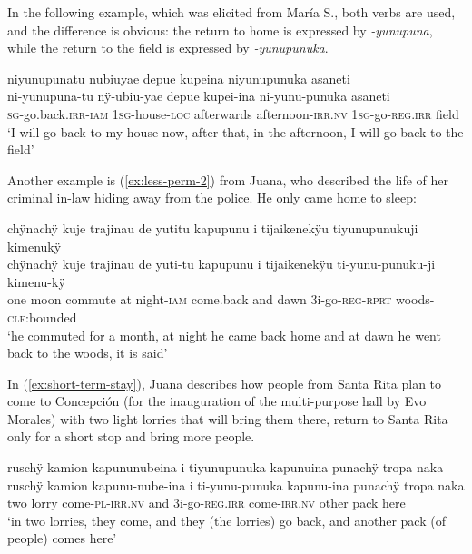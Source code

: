 In the following example, which was elicited from María S., both verbs are used, and the difference is obvious: the return to home is expressed by \textit{-yunupuna}, while the return to the field is expressed by \textit{-yunupunuka}.

\ea\label{ex:less-perm-1}
\begingl
\glpreamble niyunupunatu nubiuyae depue kupeina niyunupunuka asaneti\\
\gla ni-yunupuna-tu nÿ-ubiu-yae depue kupei-ina ni-yunu-punuka asaneti\\
\textsc{sg}-go.back.\textsc{irr}-\textsc{iam} 1\textsc{sg}-house-\textsc{loc} afterwards afternoon-\textsc{irr.nv} 1\textsc{sg}-go-\textsc{reg.irr} field\\
\glft ‘I will go back to my house now, after that, in the afternoon, I will go back to the field’
\endgl
\trailingcitation{[rxx-e181020le]}
\xe

Another example is (\ref{ex:less-perm-2}) from Juana, who described the life of her criminal in-law hiding away from the police. He only came home to sleep:

\ea\label{ex:less-perm-2}
\begingl
\glpreamble chÿnachÿ kuje trajinau de yutitu kapupunu i tijaikenekÿu tiyunupunukuji kimenukÿ\\
\gla chÿnachÿ kuje trajinau {de yuti}-tu kapupunu i tijaikenekÿu ti-yunu-punuku-ji kimenu-kÿ\\
\glb one moon commute {at night}-\textsc{iam} come.back and dawn 3i-go-\textsc{reg}-\textsc{rprt} woods-\textsc{clf:}bounded\\
\glft ‘he commuted for a month, at night he came back home and at dawn he went back to the woods, it is said’
\endgl
\trailingcitation{[jxx-p120430l-2.119-123]}
\xe

In (\ref{ex:short-term-stay}), Juana describes how people from Santa Rita plan to come to Concepción (for the inauguration of the multi-purpose hall by Evo Morales) with two light lorries that will bring them there, return to Santa Rita only for a short stop and bring more people.

\ea\label{ex:short-term-stay}
\begingl 
\glpreamble ruschÿ kamion kapununubeina i tiyunupunuka kapunuina punachÿ tropa naka\\
\gla ruschÿ kamion kapunu-nube-ina i ti-yunu-punuka kapunu-ina punachÿ tropa naka\\ 
\glb two lorry come-\textsc{pl}-\textsc{irr.nv} and 3i-go-\textsc{reg.irr} come-\textsc{irr.nv} other pack here\\ 
\glft ‘in two lorries, they come, and they (the lorries) go back, and another pack (of people) comes here’\\ 
\endgl
\trailingcitation{[jxx-p150920l.080]}
\xe


